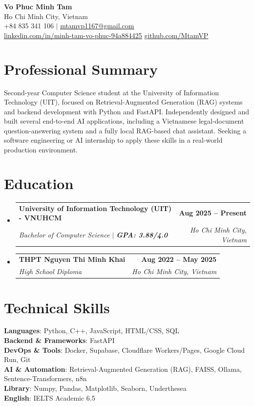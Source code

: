 \documentclass[letterpaper,11pt]{article}
\makeatletter
\newcommand{\resumeEduHeading}[4]{
  \vspace{-2pt}\item
    \begin{tabular*}{1.0\textwidth}[t]{l@{\extracolsep{\fill}}r}
      \textbf{#1} & \textbf{#2} \\
      \textit{\small#3} & \textit{\small #4} \\
    \end{tabular*}\vspace{-7pt}
}
\newcommand{\resumeSubHeadingListStart}{\begin{itemize}[leftmargin=0.0in, label={}]}
\newcommand{\resumeSubHeadingListEnd}{\end{itemize}}
\makeatother
\begin{document}
\begin{center}
    \textbf{\Huge Vo Phuc Minh Tam} \\ \vspace{4pt}
    \small Ho Chi Minh City, Vietnam \\ \vspace{2pt}
    \small +84 835 341 106 $|$ \href{mailto:mtamvp1167@gmail.com}{\underline{mtamvp1167@gmail.com}} \\
    \href{https://www.linkedin.com/in/minh-tam-vo-phuc-94a884425}{\underline{linkedin.com/in/minh-tam-vo-phuc-94a884425}} \quad
    \href{https://github.com/MtamVP}{\underline{github.com/MtamVP}}
\end{center}

\section{Professional Summary}
 \small{Second-year Computer Science student at the University of Information Technology (UIT), focused on Retrieval-Augmented Generation (RAG) systems and backend development with Python and FastAPI. Independently designed and built several end-to-end AI applications, including a Vietnamese legal-document question-answering system and a fully local RAG-based chat assistant. Seeking a software engineering or AI internship to apply these skills in a real-world production environment.} \vspace{4pt}
 
\section{Education}
  \resumeSubHeadingListStart
    \resumeEduHeading
      {University of Information Technology (UIT) - VNUHCM}{Aug 2025 -- Present}
      {Bachelor of Computer Science $|$ \textbf{GPA: 3.88/4.0}}{Ho Chi Minh City, Vietnam}
    \resumeEduHeading
      {THPT Nguyen Thi Minh Khai}{Aug 2022 -- May 2025}
      {High School Diploma}{Ho Chi Minh City, Vietnam}
  \resumeSubHeadingListEnd

\section{Technical Skills}
 \begin{itemize}[leftmargin=0.15in, label={}]
    \small{\item{
     \textbf{Languages}{: Python, C++, JavaScript, HTML/CSS, SQL} \\
     \textbf{Backend \& Frameworks}{: FastAPI} \\
     \textbf{DevOps \& Tools}{: Docker, Supabase, Cloudflare Workers/Pages, Google Cloud Run, Git} \\
     \textbf{AI \& Automation}{: Retrieval-Augmented Generation (RAG), FAISS, Ollama, Sentence-Transformers, n8n} \\
     \textbf{Library}{: Numpy, Pandas, Matplotlib, Seaborn, Underthesea}\\
     \textbf{English}{: IELTS Academic 6.5}
    }}
 \end{itemize}
\end{document}
